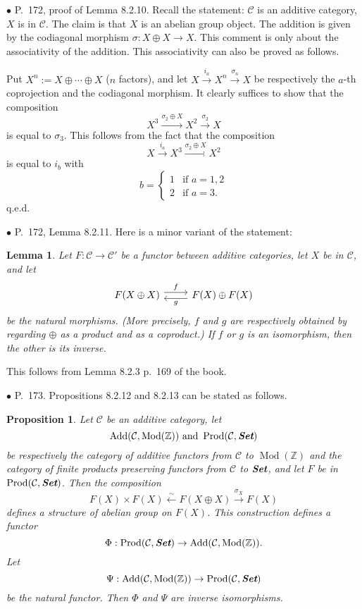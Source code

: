 \documentclass[12pt]{article}
\newtheorem{lem}[thm]{Lemma}
\newtheorem{prop}[thm]{Proposition}
\theoremstyle{remark}%
\newcommand{\bu}{\bullet}
\newcommand{\n}{\noindent}
\newcommand{\C}{\mathcal C}
\newcommand{\xr}{\xrightarrow}
\newcommand{\pr}{Proposition}
\DeclareMathOperator{\Mod}{Mod}
\begin{document}
\n$\bu$ P.~172, proof of Lemma 8.2.10. Recall the statement: $\C$ is an additive category, $X$ is in $\C$. The claim is that $X$ is an abelian group object. The addition is given by the codiagonal morphism $\sigma:X\oplus X\to X$. This comment is only about the associativity of the addition. This associativity can also be proved as follows. 

Put $X^n:=X\oplus\cdots\oplus X$ ($n$ factors), and let $X\xr{i_a}X^n\xr{\sigma_n}X$ be respectively the $a$-th coprojection and the codiagonal morphism. It clearly suffices to show that the composition 
$$
X^3\xr{\sigma_2\oplus X}X^2\xr{\sigma_2}X
$$ 
is equal to $\sigma_3$. This follows from the fact that the composition 
$$
X\xr{i_a}X^3\xr{\sigma_2\oplus X}X^2
$$ 
is equal to $i_b$ with 
$$
b=\begin{cases}1&\text{if }a=1,2\\2&\text{if }a=3.\end{cases}
$$ 
q.e.d. 


\n$\bu$ P.~172, Lemma 8.2.11. Here is a minor variant of the statement: 
%
\begin{lem}
Let $F:\C\to\C'$ be a functor between additive categories, let $X$ be in $\C$, and let 
$$
\begin{tikzcd}
F(X\oplus X)\ar[yshift=.7ex]{r}{f}&F(X)\oplus F(X)\ar[yshift=-.7ex]{l}{g}
\end{tikzcd}
$$ 
be the natural morphisms. (More precisely, $f$ and $g$ are respectively obtained by regarding $\oplus$ as a product and as a coproduct.) If $f$ or $g$ is an isomorphism, then the other is its inverse. 
\end{lem}
% 
This follows from Lemma 8.2.3 p.~169 of the book.\bigskip 


\n$\bu$ P.~173. \pr s 8.2.12 and 8.2.13 can be stated as follows. 
%
\begin{prop}\label{8212}
%
Let $\C$ be an additive category, let 
$$
\operatorname{Add}(\C,\Mod(\mathbb Z))\text{ and }\operatorname{Prod}(\C,\textbf{\em Set})
$$ 
be respectively the category of additive functors from $\C$ to $\Mod(\mathbb Z)$ and the category of finite products preserving functors from $\C$ to $\textbf{\em Set}$, and let $F$ be in $\operatorname{Prod}(\C,\textbf{\em Set})$. Then the composition 
$$
F(X)\times F(X)\xleftarrow\sim F(X\oplus X)\xr{\sigma_X}F(X)
$$ 
defines a structure of abelian group on $F(X)$. This construction defines a functor 
$$
\Phi:\operatorname{Prod}(\C,\textbf{\em Set})\to\operatorname{Add}(\C,\Mod(\mathbb Z)).
$$ 
Let 
$$
\Psi:\operatorname{Add}(\C,\Mod(\mathbb Z))\to\operatorname{Prod}(\C,\textbf{\em Set})
$$ 
be the natural functor. Then $\Phi$ and $\Psi$ are inverse isomorphisms. 
%
\end{prop}
\end{document}
